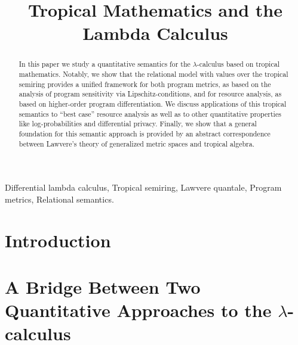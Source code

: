 \documentclass[conference]{IEEEtran}
\begin{document}
\title{Tropical Mathematics and the Lambda Calculus}


\maketitle

\begin{abstract}
In this paper we study a quantitative semantics for the $\lambda$-calculus based on tropical mathematics. Notably, we show that the relational model with values over the tropical semiring 
provides a unified framework for both 
program metrics, as based on the analysis of program sensitivity via Lipschitz-conditions, and for resource analysis, as based on higher-order program differentiation.
We discuss applications of this tropical semantics to ``best case'' resource analysis as well as to other quantitative properties like log-probabilities and differential privacy.
Finally, we show that a general foundation for this semantic approach is provided by an abstract correspondence between Lawvere's theory  
of generalized metric spaces and tropical algebra.



\end{abstract}

\begin{IEEEkeywords}
Differential lambda calculus, Tropical semiring, Lawvere quantale, Program metrics, Relational semantics.
\end{IEEEkeywords}

\section{Introduction}



\section{A Bridge Between Two Quantitative Approaches to the $\lambda$-calculus}\label{section2}

\end{document}
